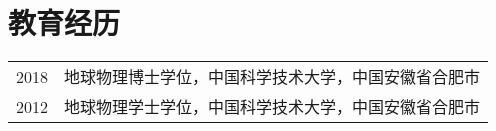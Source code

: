 \section*{教育经历}
\begin{tabular}{p{} p{}}
2018 & 地球物理博士学位，中国科学技术大学，中国安徽省合肥市 \\
2012 & 地球物理学士学位，中国科学技术大学，中国安徽省合肥市
\end{tabular}
